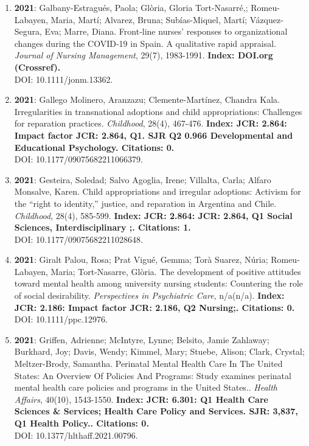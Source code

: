 \begin{enumerate}
\item {\bf 2021}: Galbany-Estragués, Paola; Glòria, Gloria Tort-Nasarré,; Romeu-Labayen, Maria, Martí; Alvarez, Bruna; Subías-Miquel, Martí; Vázquez-Segura, Eva; Marre, Diana.  Front‐line nurses’ responses to organizational changes during the COVID‐19 in Spain. A qualitative rapid appraisal. {\it Journal of Nursing Management}, 29(7), 1983-1991. {\bf Index: DOI.org (Crossref). } \\ DOI: 10.1111/jonm.13362. \filbreak
\item {\bf 2021}: Gallego Molinero, Aranzazu; Clemente-Martínez, Chandra Kala.  Irregularities in transnational adoptions and child appropriations: Challenges for reparation practices. {\it Childhood}, 28(4), 467-476. {\bf Index: JCR: 2.864: Impact factor JCR: 2.864, Q1.  SJR Q2 0.966 Developmental and Educational Psychology. Citations: 0. } \\ DOI: 10.1177/09075682211066379. \filbreak
\item {\bf 2021}: Gesteira, Soledad; Salvo Agoglia, Irene; Villalta, Carla; Alfaro Monsalve, Karen.  Child appropriations and irregular adoptions: Activism for the “right to identity,” justice, and reparation in Argentina and Chile. {\it Childhood}, 28(4), 585-599. {\bf Index: JCR: 2.864: JCR: 2.864, Q1 Social Sciences, Interdisciplinary ;.  Citations: 1. } \\ DOI: 10.1177/09075682211028648. \filbreak
\item {\bf 2021}: Giralt Palou, Rosa; Prat Vigué, Gemma; Torà Suarez, Núria; Romeu-Labayen, Maria; Tort-Nasarre, Glòria.  The development of positive attitudes toward mental health among university nursing students: Countering the role of social desirability. {\it Perspectives in Psychiatric Care}, n/a(n/a). {\bf Index: JCR: 2.186: Impact factor JCR: 2.186, Q2 Nursing;.  Citations: 0. } \\ DOI: 10.1111/ppc.12976. \filbreak
\item {\bf 2021}: Griffen, Adrienne; McIntyre, Lynne; Belsito, Jamie Zahlaway; Burkhard, Joy; Davis, Wendy; Kimmel, Mary; Stuebe, Alison; Clark, Crystal; Meltzer-Brody, Samantha.  Perinatal Mental Health Care In The United States: An Overview Of Policies And Programs: Study examines perinatal mental health care policies and programs in the United States.. {\it Health Affairs}, 40(10), 1543-1550. {\bf Index: JCR: 6.301: Q1 Health Care Sciences \& Services; Health Care Policy and Services.  SJR: 3,837, Q1 Health Policy.. Citations: 0. } \\ DOI: 10.1377/hlthaff.2021.00796. \filbreak

\end{enumerate}

